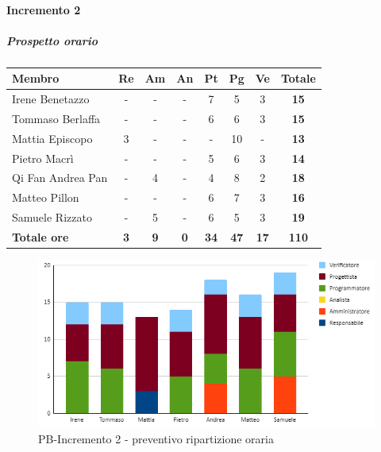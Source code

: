 \paragraph{Incremento 2}
\subparagraph{Prospetto orario}
\begin{center}
	\renewcommand{\arraystretch}{1.8} %
	\begin{tabular}{ |m{10em}|c|c|c|c|c|c|c| }
	\hline
	\textbf{Membro} & \textbf{Re} & \textbf{Am} &  \textbf{An} &  \textbf{Pt} &  \textbf{Pg} &  \textbf{Ve} &  \textbf{Totale}\\
    \hline
    Irene Benetazzo   & - & - & - & 7 & 5 & 3 & \textbf{15} \\
    \hline
    Tommaso Berlaffa  & - & - & - & 6 & 6 & 3 & \textbf{15} \\
    \hline
    Mattia Episcopo   & 3 & - & - & - & 10 & - & \textbf{13} \\
    \hline
    Pietro Macrì      & - & - & - & 5 & 6 & 3 & \textbf{14} \\
    \hline
    Qi Fan Andrea Pan & - & 4 & - & 4 & 8 & 2 & \textbf{18} \\
    \hline
    Matteo Pillon     & - & - & - & 6 & 7 & 3 & \textbf{16} \\
    \hline
    Samuele Rizzato   & - & 5 & - & 6 & 5 & 3 & \textbf{19} \\
    \hline
    \textbf{Totale ore} & \textbf{3} & \textbf{9} &  \textbf{0} &  \textbf{34} &  \textbf{47} &  \textbf{17} &  \textbf{110}\\
    \hline
	\end{tabular}
\end{center}
\begin{figure}[H]
   \centering\includegraphics{images/preventivo/PB-incremento2-ore.png}
   \caption{PB-Incremento 2 - preventivo ripartizione oraria}
\end{figure}

